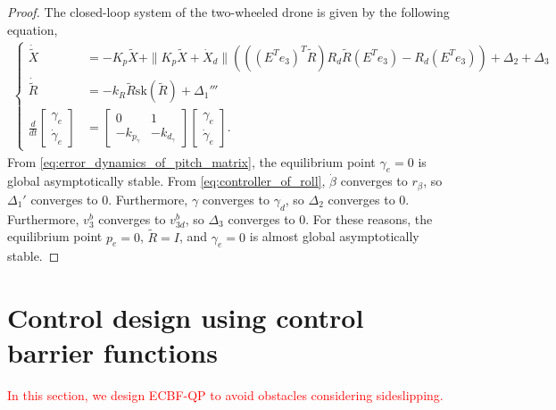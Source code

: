 \begin{proof}
    The closed-loop system of the two-wheeled drone is given by the following equation,
    \begin{align}
        \label{eq:stability_proof_of_cascade_1}
        \begin{cases}
            \dot{\tilde{X}} &= - K_p \tilde{X} + \| K_p \tilde{X} + \dot{X}_d \| \left ( \left ( \left (E^Te_3 \right )^T \tilde{R} \right ) R_d \tilde{R} (E^T e_3) - R_d (E^T e_3) \right ) + \Delta_2 + \Delta_3 \\
            \dot{\tilde{R}} &= - k_R \tilde{R} \mathrm{sk} (\tilde{R}) + \Delta_1''' \\
            \frac{d}{dt}
            \begin{bmatrix}
                \gamma_e \\
                \dot{\gamma}_e
            \end{bmatrix}
            &=
            \begin{bmatrix}
                0 & 1 \\
                - k_{p_{\gamma}} & -k_{d_{\gamma}}
            \end{bmatrix}
            \begin{bmatrix}
                \gamma_e \\
                \dot{\gamma}_e
            \end{bmatrix}.
        \end{cases}
    \end{align}
    From \eqref{eq:error_dynamics_of_pitch_matrix}, the equilibrium point $ \gamma_e = 0 $ is global asymptotically stable.
    From \eqref{eq:controller_of_roll}, $ \dot{\beta} $ converges to $ r_{\beta} $, so $ \Delta_1' $ converges to $ 0 $.
    Furthermore, $ \gamma $ converges to $ \gamma_d $, so $ \Delta_2 $ converges to $ 0 $.
    Furthermore, $ v_3^b $ converges to $ v_{3d}^b $, so $ \Delta_3 $ converges to $ 0 $.
    For these reasons, the equilibrium point $ p_e = 0 $, $ \tilde{R} = I $, and $ \gamma_e = 0 $ is almost global asymptotically stable. 
\end{proof}

\section{Control design using control barrier functions}
\label{sec:control_design_using_CBF}
\textcolor{red}{In this section, we design ECBF-QP to avoid obstacles considering sideslipping.}

